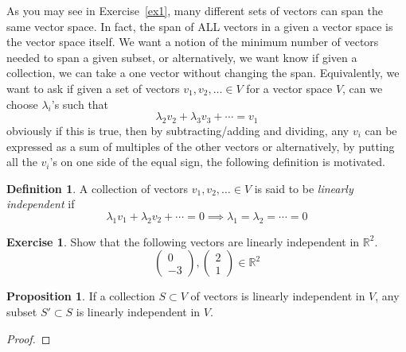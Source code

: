 \documentclass[11pt, reqno]{amsart}
\theoremstyle{definition} %
\newtheorem{definition}[theorem]{Definition}
\newtheorem{exercise}[theorem]{Exercise}
\newtheorem{proposition}[theorem]{Proposition}
\newcommand{\R}{\mathbb{R}}
\begin{document}
As you may see in Exercise~\ref{ex1}, many different sets of vectors can span the same vector space. In fact, the span of ALL vectors in a given a vector space is the vector space itself. We want a notion of the minimum number of vectors needed to span a given subset, or alternatively, we want know if given a collection, we can take a one vector without changing the span. Equivalently, we want to ask if given a set of vectors $v_1,v_2,\dots\in V$ for a vector space $V$, can we choose $\lambda_i$'s such that 
\begin{equation}
    \lambda_2v_2+\lambda_3v_3+\cdots=v_1
\end{equation}
obviously if this is true, then by subtracting/adding and dividing, any $v_i$ can be expressed as a sum of multiples of the other vectors or alternatively, by putting all the $v_i$'s on one side of the equal sign, the following definition is motivated.

\begin{definition}
    A collection of vectors $v_1,v_2,\dots\in V$ is said to be \emph{linearly independent} if 
    \begin{equation}
        \lambda_1v_1+\lambda_2v_2+\cdots=0\implies \lambda_1=\lambda_2=\cdots=0
    \end{equation}
\end{definition}

\begin{exercise}
    Show that the following vectors are linearly independent in $\R^2$.
    \begin{equation}
        \begin{pmatrix}
            0\\
            -3
        \end{pmatrix}
        ,
        \begin{pmatrix}
            2\\
            1
        \end{pmatrix}
        \in\R^2
    \end{equation}
\end{exercise}

\begin{proposition}
    If a collection $S\subset V$ of vectors is linearly independent in $V$, any subset $S'\subset S$ is linearly independent in $V$.
    \begin{proof}
        
    \end{proof}
\end{proposition}
\end{document}
